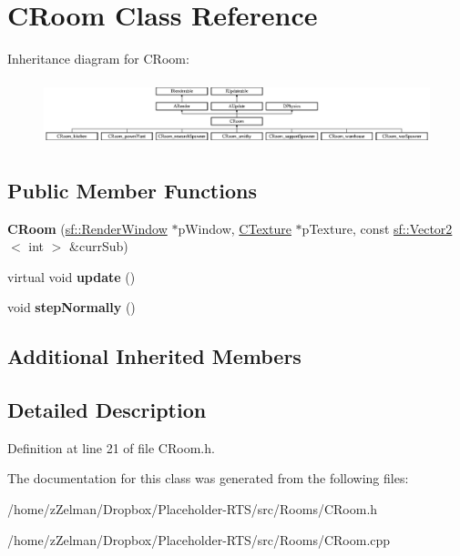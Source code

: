 \hypertarget{classCRoom}{\section{C\-Room Class Reference}
\label{classCRoom}
}
Inheritance diagram for C\-Room\-:\begin{figure}[H]
\begin{center}
\leavevmode
\includegraphics[height=1.904762cm]{classCRoom}
\end{center}
\end{figure}
\subsection*{Public Member Functions}
\begin{DoxyCompactItemize}
\item 
\hypertarget{classCRoom_aa36b6e097259bb7356d7a38b649f96ac}{{\bfseries C\-Room} (\hyperlink{classsf_1_1RenderWindow}{sf\-::\-Render\-Window} $\ast$p\-Window, \hyperlink{classCTexture}{C\-Texture} $\ast$p\-Texture, const \hyperlink{classsf_1_1Vector2}{sf\-::\-Vector2}$<$ int $>$ \&curr\-Sub)}\label{classCRoom_aa36b6e097259bb7356d7a38b649f96ac}

\item 
\hypertarget{classCRoom_a554288f277403d72aa6eae4139096996}{virtual void {\bfseries update} ()}\label{classCRoom_a554288f277403d72aa6eae4139096996}

\item 
\hypertarget{classCRoom_ada8b3e3ffc799354d377df71e5ee6b7d}{void {\bfseries step\-Normally} ()}\label{classCRoom_ada8b3e3ffc799354d377df71e5ee6b7d}

\end{DoxyCompactItemize}
\subsection*{Additional Inherited Members}


\subsection{Detailed Description}


Definition at line 21 of file C\-Room.\-h.



The documentation for this class was generated from the following files\-:\begin{DoxyCompactItemize}
\item 
/home/z\-Zelman/\-Dropbox/\-Placeholder-\/\-R\-T\-S/src/\-Rooms/C\-Room.\-h\item 
/home/z\-Zelman/\-Dropbox/\-Placeholder-\/\-R\-T\-S/src/\-Rooms/C\-Room.\-cpp\end{DoxyCompactItemize}
